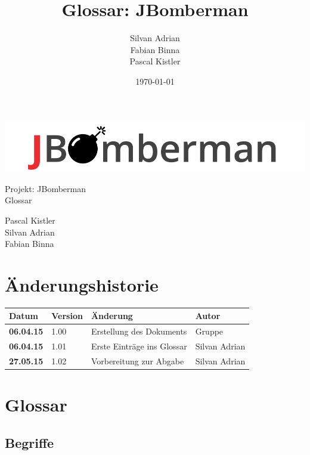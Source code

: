 \documentclass[11pt]{scrartcl}
\title{Glossar: JBomberman}
\author{Silvan Adrian \\ Fabian Binna \\ Pascal Kistler}
\date{\today{}}
\begin{document}
\def\arraystretch{1.5}
\begin{titlepage}
\begin{center}
\vspace{10em}
\includegraphics[scale=2]{jbomberman}
\vspace{10em}
\end{center}
\begin{center}
\huge {Projekt: JBomberman} \\
\huge {Glossar}
\end{center}
\begin{center}
\vspace{10em}
\LARGE {Pascal Kistler} \\
\LARGE {Silvan Adrian} \\
\LARGE {Fabian Binna}
\end{center}

\end{titlepage}

\newpage
\section{Änderungshistorie}
\label{sec:Änderungen}

\begin{tabularx}{\linewidth}{l l l l}
\textbf{Datum} & \textbf{Version} & \textbf{Änderung}  & \textbf{Autor} \\
\hline
\textbf{06.04.15} & 1.00 & Erstellung des Dokuments & Gruppe \\
\textbf{06.04.15} & 1.01 & Erste Einträge ins Glossar & Silvan Adrian \\
\textbf{27.05.15} & 1.02 & Vorbereitung zur Abgabe & Silvan Adrian\\
\end{tabularx}

\newpage
\tableofcontents
\newpage
\section{Glossar}
\subsection{Begriffe}
\end{document}
